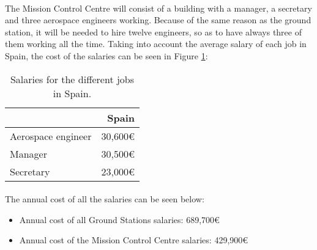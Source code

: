 \paragraph{}The Mission Control Centre will consist of a building with a manager, a secretary and three aerospace engineers working. Because of the same reason as the ground station, it will be needed to hire twelve engineers, so as to have always three of them working all the time. Taking into account the average salary of each job in Spain, the cost of the salaries can be seen in Figure \ref{table:SalariesSpain}:

\begin{table}[H]
\begin{center}
\begin{tabular}{|l|r|}
\hline 
 & Spain \\ 
\hline 
Aerospace engineer & 30,600\euro \\ 
\hline 
Manager & 30,500\euro  \\ 
\hline 
Secretary & 23,000\euro  \\ 
\hline 
\end{tabular}
\end{center}
\caption[Salaries in Spain]{Salaries for the different jobs in Spain.}
\label{table:SalariesSpain}
\end{table}

\paragraph{}The annual cost of all the salaries can be seen below:
\begin{itemize}
\item Annual cost of all Ground Stations salaries: 689,700\euro
\item Annual cost of the Mission Control Centre salaries: 429,900\euro
\end{itemize}

